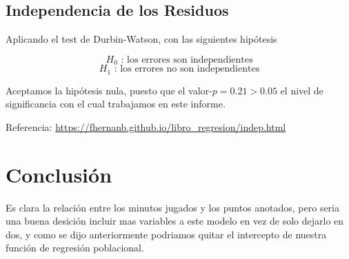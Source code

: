 \documentclass[onecolumn]{IEEEtran}
\begin{document}
    \subsection{Independencia de los Residuos}

    Aplicando el test de Durbin-Watson, con las siguientes hip\'otesis
    
    $$
        H_0\text{ : los errores son independientes}
    $$
    $$
        H_1\text{ : los errores no son independientes}
    $$

    Aceptamos la hip\'otesis nula, puesto que el valor-$p = 0.21 > 0.05$ el nivel de significancia con el cual trabajamos en este informe. 

    Referencia: \url{https://fhernanb.github.io/libro_regresion/indep.html}

    \section{Conclusi\'on}
    Es clara la relaci\'on entre los minutos jugados y los puntos anotados, pero seria una buena desici\'on incluir mas variables a este modelo en vez de solo dejarlo en dos, y como se dijo anteriormente podriamos quitar el intercepto de nuestra funci\'on de regresi\'on poblacional.
\end{document}
